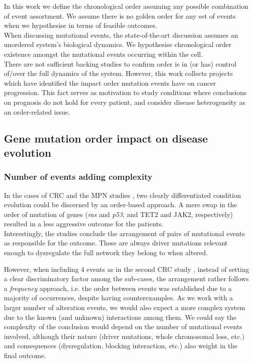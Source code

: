 In this work we define the chronological order assuming any possible combination of event assortment. We assume there is no golden order for any set of events when we hypothesise in terms of feasible outcomes.
\\

When discussing mutational events, the state-of-the-art discussion assumes an unordered system's biological dynamics. We hypothesise chronological order existence amongst the mutational events occurring within the cell.
\\

There are not sufficient backing studies to confirm order is in (or has) control of/over the full dynamics of the system. However, this work collects projects which have identified the impact order mutation events have on cancer progression. This fact serves as motivation to study conditions where conclusions on prognosis do not hold for every patient, and consider disease heterogeneity as an order-related issue.

\subsection{Gene mutation order impact on disease evolution}
\subsubsection{Number of events adding complexity}
In the cases of CRC \cite{Herbet2012AcquisitionPhenotypes} and the MPN studies \cite{Ortmann2015EffectNeoplasms}, two clearly differentiated condition evolution could be discerned by an order-based approach. A mere swap in the order of mutation of genes (\textit{ras} and \textit{p53}, and TET2 and JAK2, respectively) resulted in a less aggressive outcome for the patients. 
\\

Interestingly, the studies conclude the arrangement of pairs of mutational events as responsible for the outcome. These are always driver mutations relevant enough to dysregulate the full network they belong to when altered.

However, when including 4 events as in the second CRC study \cite{Fearon1990ATumorigenesis}, instead of setting a clear discriminatory factor among the sub-cases, the arrangement rather follows a \textit{frequency} approach, i.e. the order between events was established due to a majority of occurrences, despite having counterexamples. As we work with a larger number of alteration events, we would also expect a more complex system due to the known (and unknown) interactions among them. We could say the complexity of the conclusion would depend on the number of mutational events involved, although their nature (driver mutations, whole chromosomal loss, etc.) and consequences (dysregulation, blocking interaction, etc.) also weight in the final outcome.
\\

